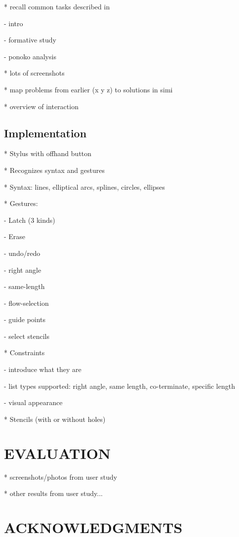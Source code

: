 \documentclass{article}
\begin{document}
* recall common tasks described in

  - intro

  - formative study

  - ponoko analysis

* lots of screenshots

* map problems from earlier (x y z) to solutions in simi

* overview of interaction

\subsection{Implementation}

* Stylus with offhand button

* Recognizes syntax and gestures

* Syntax: lines, elliptical arcs, splines, circles, ellipses

* Gestures:

  - Latch (3 kinds) 

  - Erase 

  - undo/redo

  - right angle

  - same-length 

  - flow-selection

  - guide points

  - select stencils

* Constraints

  - introduce what they are

  - list types supported: right angle, same length, co-terminate, specific length

  - visual appearance

* Stencils (with or without holes)

\section{EVALUATION}

* screenshots/photos from user study

* other results from user study...

\section{ACKNOWLEDGMENTS}



\end{document}
